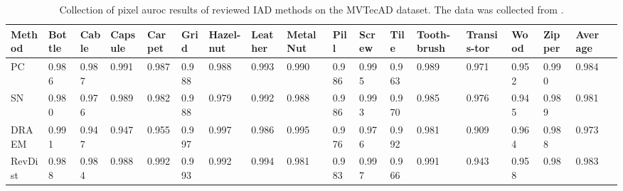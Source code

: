 \begin{table}[htbp]
    \tiny
    \centering
    \begin{tabularx}{\textwidth}{|X|X|X|X|X|X|X|X|X|X|X|X|X|X|X|X|X|X|}%
        \hline
        \textbf{Method} & \textbf{Bottle} & \textbf{Cable} & \textbf{Capsule} & \textbf{Carpet} & \textbf{Grid} & \textbf{Hazel-nut} & \textbf{Leather} & \textbf{Metal Nut} & \textbf{Pill} & \textbf{Screw} & \textbf{Tile} & \textbf{Tooth-brush} & \textbf{Transis-tor} & \textbf{Wood} & \textbf{Zipper} & \textbf{Average} \\
        \hline
        PC \cite{patchCore2022} & 0.986 & 0.987 & 0.991 & 0.987 & 0.988 & 0.988 & 0.993 & 0.990 & 0.986 & 0.995 & 0.963 & 0.989 & 0.971 & 0.952 & 0.990 & 0.984 \\
        \hline
        SN \cite{liu2023simplenet} & 0.980 & 0.976 & 0.989 & 0.982 & 0.988 & 0.979 & 0.992 & 0.988 & 0.986 & 0.993 & 0.970 & 0.985 & 0.976 & 0.945 & 0.989 & 0.981 \\
        \hline
        DRAEM \cite{Zavrtanik_2021DRAEM} & 0.991 & 0.947 & 0.947 & 0.955 & 0.997 & 0.997 & 0.986 & 0.995 & 0.976 & 0.976 & 0.992 & 0.981 & 0.909 & 0.964 & 0.988 & 0.973 \\
        \hline
        RevDist \cite{revdist2023} & 0.988 & 0.984 & 0.988 & 0.992 & 0.993 & 0.992 & 0.994 & 0.981 & 0.983 & 0.997 & 0.966 & 0.991 & 0.943 & 0.958 & 0.98 & 0.983 \\
        \hline
    \end{tabularx}
    \caption{Collection of pixel auroc results of reviewed IAD methods on the MVTecAD \cite{MVTEC_Bergmann_2021} dataset. The data was collected from \cite{liu2024deep} \cite{liu2023simplenet} \cite{Zavrtanik_2021DRAEM} \cite{revdist2023}.}
    \label{tab:pixelaurocmvtec}
\end{table}






